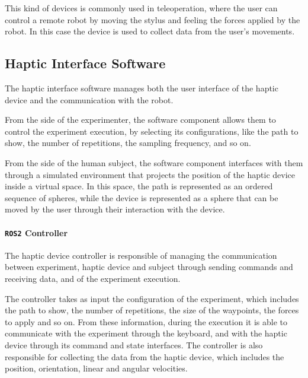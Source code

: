 \documentclass[12pt]{report}
\begin{document}
This kind of devices is commonly used in teleoperation, where the user can control a remote robot by moving the stylus and feeling the forces applied by the robot. In this case the device is used to collect data from the user's movements. 
\subsection{Haptic Interface Software}
The haptic interface software manages both the user interface of the haptic device and the communication with the robot.

From the side of the experimenter, the software component allows them to control the experiment execution, by selecting its configurations, like the path to show, the number of repetitions, the sampling frequency, and so on.

From the side of the human subject, the software component interfaces with them through a simulated environment that projects the position of the haptic device inside a virtual space. In this space, the path is represented as an ordered sequence of spheres, while the device is represented as a sphere that can be moved by the user through their interaction with the device.

\paragraph{\texttt{ROS2} Controller}
The haptic device controller is responsible of managing the communication between experiment, haptic device and subject through sending commands and receiving data, and of the experiment execution. 

The controller takes as input the configuration of the experiment, which includes the path to show, the number of repetitions, the size of the waypoints, the forces to apply and so on. From these information, during the execution it is able to communicate with the experiment through the keyboard, and with the haptic device through its command and state interfaces. The controller is also responsible for collecting the data from the haptic device, which includes the position, orientation, linear and angular velocities.
\end{document}
